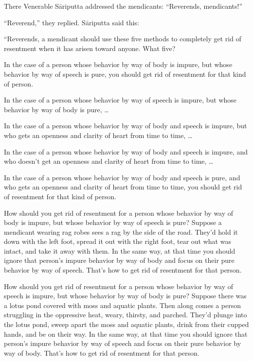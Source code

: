 \documentclass[12pt,openany]{book}%
\begin{document}
There Venerable \textsanskrit{Sāriputta} addressed the mendicants: “Reverends, mendicants!” 

“Reverend,” they replied. \textsanskrit{Sāriputta} said this: 

“Reverends, a mendicant should use these five methods to completely get rid of resentment when it has arisen toward anyone. What five? 

In the case of a person whose behavior by way of body is impure, but whose behavior by way of speech is pure, you should get rid of resentment for that kind of person. 

In the case of a person whose behavior by way of speech is impure, but whose behavior by way of body is pure, … 

In the case of a person whose behavior by way of body and speech is impure, but who gets an openness and clarity of heart from time to time, … 

In the case of a person whose behavior by way of body and speech is impure, and who doesn’t get an openness and clarity of heart from time to time, … 

In the case of a person whose behavior by way of body and speech is pure, and who gets an openness and clarity of heart from time to time, you should get rid of resentment for that kind of person. 

How should you get rid of resentment for a person whose behavior by way of body is impure, but whose behavior by way of speech is pure? Suppose a mendicant wearing rag robes sees a rag by the side of the road. They’d hold it down with the left foot, spread it out with the right foot, tear out what was intact, and take it away with them. In the same way, at that time you should ignore that person’s impure behavior by way of body and focus on their pure behavior by way of speech. That’s how to get rid of resentment for that person. 

How should you get rid of resentment for a person whose behavior by way of speech is impure, but whose behavior by way of body is pure? Suppose there was a lotus pond covered with moss and aquatic plants. Then along comes a person struggling in the oppressive heat, weary, thirsty, and parched. They’d plunge into the lotus pond, sweep apart the moss and aquatic plants, drink from their cupped hands, and be on their way. In the same way, at that time you should ignore that person’s impure behavior by way of speech and focus on their pure behavior by way of body. That’s how to get rid of resentment for that person. 
\end{document}
